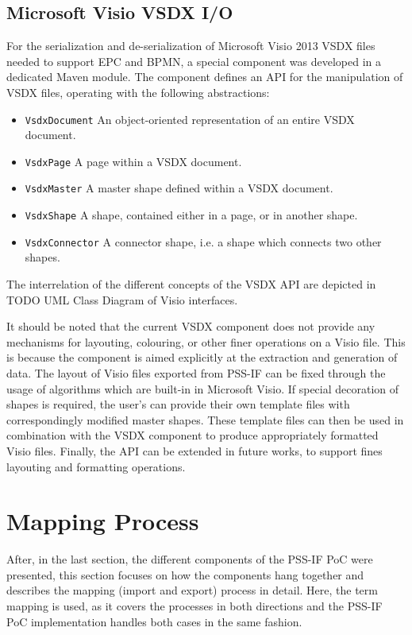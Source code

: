 \subsection{Microsoft Visio VSDX I/O}

For the serialization and de-serialization of Microsoft Visio 2013 VSDX files needed to support EPC and BPMN, a special component was developed in a dedicated Maven module. The component defines an API for the manipulation of VSDX files, operating with the following abstractions:

\begin{itemize}
\item \texttt{VsdxDocument} An object-oriented representation of an entire VSDX document.
\item \texttt{VsdxPage} A page within a VSDX document.
\item \texttt{VsdxMaster} A master shape defined within a VSDX document.
\item \texttt{VsdxShape} A shape, contained either in a page, or in another shape.
\item \texttt{VsdxConnector} A connector shape, i.e. a shape which connects two other shapes.
\end{itemize}

The interrelation of the different concepts of the VSDX API are depicted in \color{red} TODO UML Class Diagram of Visio interfaces\color{black}.

It should be noted that the current VSDX component does not provide any mechanisms for layouting, colouring, or other finer operations on a Visio file. This is because the component is aimed explicitly at the extraction and generation of data. The layout of Visio files exported from PSS-IF can be fixed through the usage of algorithms which are built-in in Microsoft Visio. If special decoration of shapes is required, the user's can provide their own template files with correspondingly modified master shapes. These template files can then be used in combination with the VSDX component to produce appropriately formatted Visio files. Finally, the API can be extended in future works, to support fines layouting and formatting operations.

\section{Mapping Process}
\label{sec:impl:process}

After, in the last section, the different components of the PSS-IF PoC were presented, this section focuses on how the components hang together and describes the mapping (import and export) process in detail. Here, the term mapping is used, as it covers the processes in both directions and the PSS-IF PoC implementation handles both cases in the same fashion.

